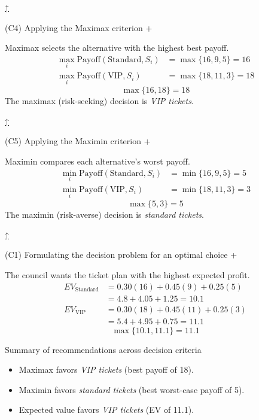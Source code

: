 \documentclass[11pt]{article}
\begin{document}
	
	
	
	\hyperref[problem2-criteria]{↑}
	
	
	
	
	(C4) Applying the Maximax criterion
	+
	
	
	Maximax selects the alternative with the highest best payoff.
	\[
	\begin{aligned}
		\max_i \text{Payoff}(\text{Standard}, S_i) &= \max\{16, 9, 5\} = 16 \\
		\max_i \text{Payoff}(\text{VIP}, S_i) &= \max\{18, 11, 3\} = 18
	\end{aligned}
	\]
	\[
	\max\{16, 18\} = 18
	\]
	The maximax (risk-seeking) decision is \emph{VIP tickets}.
	
	
	\hyperref[problem2-criteria]{↑}
	
	
	
	
	(C5) Applying the Maximin criterion
	+
	
	
	Maximin compares each alternative's worst payoff.
	\[
	\begin{aligned}
		\min_i \text{Payoff}(\text{Standard}, S_i) &= \min\{16, 9, 5\} = 5 \\
		\min_i \text{Payoff}(\text{VIP}, S_i) &= \min\{18, 11, 3\} = 3
	\end{aligned}
	\]
	\[
	\max\{5, 3\} = 5
	\]
	The maximin (risk-averse) decision is \emph{standard tickets}.
	
	
	\hyperref[problem2-criteria]{↑}
	
	
	
	
	(C1) Formulating the decision problem for an optimal choice
	+
	
	
	The council wants the ticket plan with the highest expected profit.
	\[
	\begin{aligned}
		EV_{\text{Standard}} &= 0.30(16) + 0.45(9) + 0.25(5) \\
		&= 4.8 + 4.05 + 1.25 = 10.1 \\
		EV_{\text{VIP}} &= 0.30(18) + 0.45(11) + 0.25(3) \\
		&= 5.4 + 4.95 + 0.75 = 11.1
	\end{aligned}
	\]
	\[
	\max\{10.1, 11.1\} = 11.1
	\]
	
	Summary of recommendations across decision criteria
	\begin{itemize}
		\item Maximax favors \emph{VIP tickets} (best payoff of 18).
		\item Maximin favors \emph{standard tickets} (best worst-case payoff of 5).
		\item Expected value favors \emph{VIP tickets} (EV of 11.1).
	\end{itemize}
	
\end{document}
